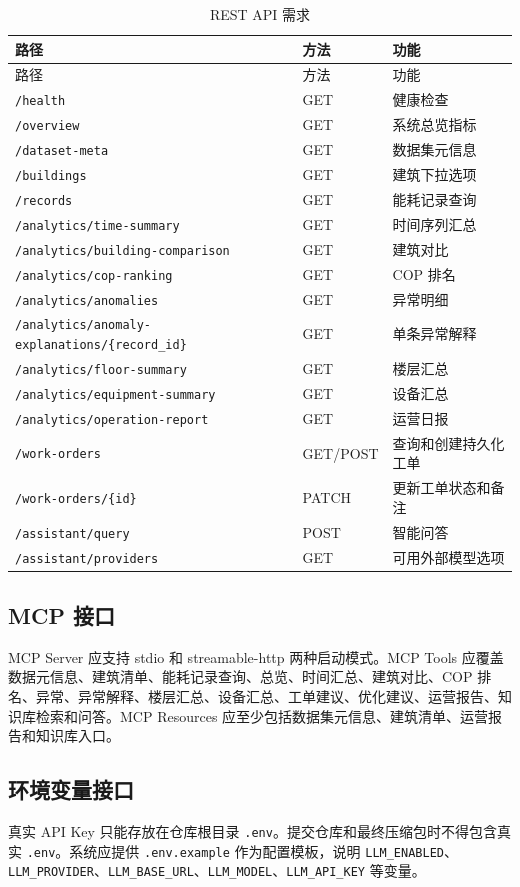 \documentclass[12pt,a4paper]{ctexart}
\newcommand{\code}[1]{{\footnotesize\nolinkurl{#1}}}
\begin{document}
\begin{longtable}{p{4.2cm}p{2.2cm}p{7.5cm}}
\caption{REST API 需求}\\
\toprule
路径 & 方法 & 功能 \\
\midrule
\endfirsthead
\toprule
路径 & 方法 & 功能 \\
\midrule
\endhead
\code{/health} & GET & 健康检查 \\
\code{/overview} & GET & 系统总览指标 \\
\code{/dataset-meta} & GET & 数据集元信息 \\
\code{/buildings} & GET & 建筑下拉选项 \\
\code{/records} & GET & 能耗记录查询 \\
\code{/analytics/time-summary} & GET & 时间序列汇总 \\
\code{/analytics/building-comparison} & GET & 建筑对比 \\
\code{/analytics/cop-ranking} & GET & COP 排名 \\
\code{/analytics/anomalies} & GET & 异常明细 \\
\code{/analytics/anomaly-explanations/\{record_id\}} & GET & 单条异常解释 \\
\code{/analytics/floor-summary} & GET & 楼层汇总 \\
\code{/analytics/equipment-summary} & GET & 设备汇总 \\
\code{/analytics/operation-report} & GET & 运营日报 \\
\code{/work-orders} & GET/POST & 查询和创建持久化工单 \\
\code{/work-orders/\{id\}} & PATCH & 更新工单状态和备注 \\
\code{/assistant/query} & POST & 智能问答 \\
\code{/assistant/providers} & GET & 可用外部模型选项 \\
\bottomrule
\end{longtable}

\subsection{MCP 接口}
MCP Server 应支持 stdio 和 streamable-http 两种启动模式。MCP Tools 应覆盖数据元信息、建筑清单、能耗记录查询、总览、时间汇总、建筑对比、COP 排名、异常、异常解释、楼层汇总、设备汇总、工单建议、优化建议、运营报告、知识库检索和问答。MCP Resources 应至少包括数据集元信息、建筑清单、运营报告和知识库入口。

\subsection{环境变量接口}
真实 API Key 只能存放在仓库根目录 \code{.env}。提交仓库和最终压缩包时不得包含真实 \code{.env}。系统应提供 \code{.env.example} 作为配置模板，说明 \code{LLM_ENABLED}、\code{LLM_PROVIDER}、\code{LLM_BASE_URL}、\code{LLM_MODEL}、\code{LLM_API_KEY} 等变量。
\end{document}
